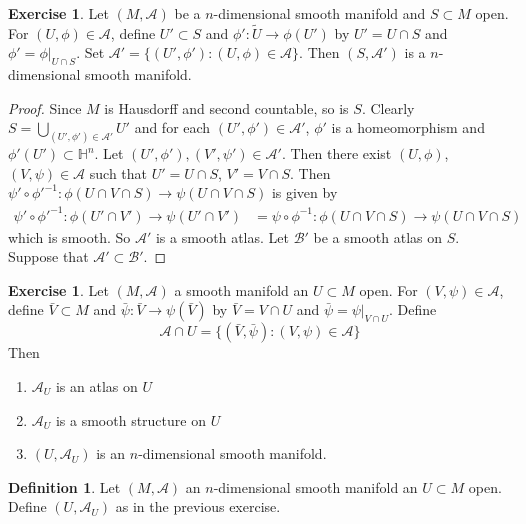 \documentclass[12pt]{amsart}
\theoremstyle{definition}
\newtheorem{defn}[definition]{Definition}
\newtheorem{ex}[definition]{Exercise}
\renewcommand{\H}{\mathbb{H}}
\newcommand{\MA}{\mathcal{A}}
\newcommand{\MB}{\mathcal{B}}
\begin{document}
	
	
	
	
	
	
	
	
	
	
	
	
	
	\begin{ex}
	Let $(M, \MA)$ be a $n$-dimensional smooth manifold and $S \subset M$ open. For $(U, \phi) \in \MA$, define $U' \subset S$ and $\phi': \tilde{U} \rightarrow \phi(U')$ by $U' = U \cap S$ and $\phi' = \phi|_{U \cap S}$. Set $\MA' = \{(U', \phi'): (U, \phi) \in \MA\}$.
	Then $(S, \MA')$ is a $n$-dimensional smooth manifold. 
	\end{ex}
	
	\begin{proof}
	Since $M$ is Hausdorff and second countable, so is $S$. Clearly $S= \bigcup\limits_{(U', \phi') \in \MA'} U'$ and for each $(U', \phi') \in \MA'$, $\phi'$ is a homeomorphism and $\phi'(U') \subset \H^n$. Let $(U', \phi'), (V', \psi') \in \MA'$. Then there exist $(U, \phi)$, $(V, \psi) \in \MA$ such that $U' = U \cap S$, $V' = V \cap S$. Then $\psi' \circ \phi'^{-1}: \phi(U \cap V \cap S) \rightarrow \psi(U \cap V \cap S)$ is given by 
	\begin{align*}
	\psi' \circ \phi'^{-1}: \phi(U' \cap V') \rightarrow \psi(U' \cap V')
	&= \psi \circ \phi^{-1}: \phi(U \cap V \cap S) \rightarrow \psi(U \cap V \cap S)
\end{align*}	 
which is smooth. So $\MA'$ is a smooth atlas. Let $\MB'$ be a smooth atlas on $S$. Suppose that $\MA' \subset \MB'$.
	\end{proof}

\begin{ex}
	Let $(M, \MA)$ a smooth manifold an $U \subset M$ open. For $(V, \psi) \in \MA$, define $\bar{V} \subset M $ and $ \bar{\psi}: \bar{V} \rightarrow \psi(\bar{V})$ by $\bar{V} = V \cap U$ and $\bar{\psi} = \psi|_{V \cap U}$. Define $$\MA \cap U = \{(\bar{V}, \bar{\psi}): (V, \psi) \in \MA\}$$ Then 
	\begin{enumerate}
		\item $\MA_U$ is an atlas on $U$
		\item $\MA_U$ is a smooth structure on $U$ 
		\item $(U, \MA_U)$ is an $n$-dimensional smooth manifold.
	\end{enumerate}
\end{ex}

\begin{defn}
	Let $(M, \MA)$ an $n$-dimensional smooth manifold an $U \subset M$ open. Define $(U, \MA_U)$ as in the previous exercise. 
\end{defn}	
	
\end{document}
